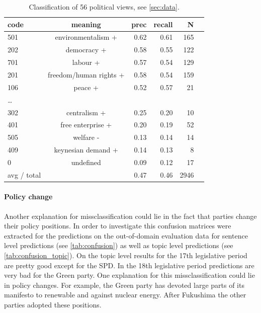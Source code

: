 \documentclass{article}
\begin{document}
\begin{table}
\caption{
\label{tab:results_avg_political_view}
Classification of 56 political views, see \autoref{sec:data}.
}
\begin{center}
\footnotesize
\begin{tabular}{lcrrrr}
code & meaning  &      prec    &recall & N\\
\hline\hline
%
       501  & environmentalism + &      0.62   &   0.61 &      165\\
        202 &   democracy + &   0.58  &    0.55   &      122\\
        701    & labour +&  0.57  &    0.54   &   129\\
                201    &freedom/human rights +  & 0.58   &   0.54   &      159\\
         106   & peace + & 0.52&      0.57   &       21\\
\dots\\
        302     &centralism + & 0.25     & 0.20  &          10\\
        401    &  free enterprise + &0.20    &  0.19    &       52\\
        505    &welfare - &  0.13   &   0.14   &      14\\
        409    & keynesian demand +&  0.14  &      0.13   &      8\\
            0    & undefined &  0.09  &    0.12   &    17\\
            \hline
avg / total  &  &  0.47    &  0.46 &    2946\\
%
\end{tabular}
\end{center}
\end{table}

\paragraph{Policy change}
Another explanation for missclassification could lie in the fact that parties change their policy positions. In order to investigate this confusion matrices were extracted for the predictions on the out-of-domain evaluation data for sentence level predictions (see \autoref{tab:confusion}) as well as topic level predictions (see \autoref{tab:confusion_topic}). On the topic level results for the 17th legislative period are pretty good except for the SPD. In the 18th legislative period predictions are very bad for the Green party. One explanation for this missclassification could lie in policy changes. For example, the Green party has devoted large parts of its manifesto to renewable and against nuclear energy. After Fukushima the other parties adopted these positions. \\
\end{document}
